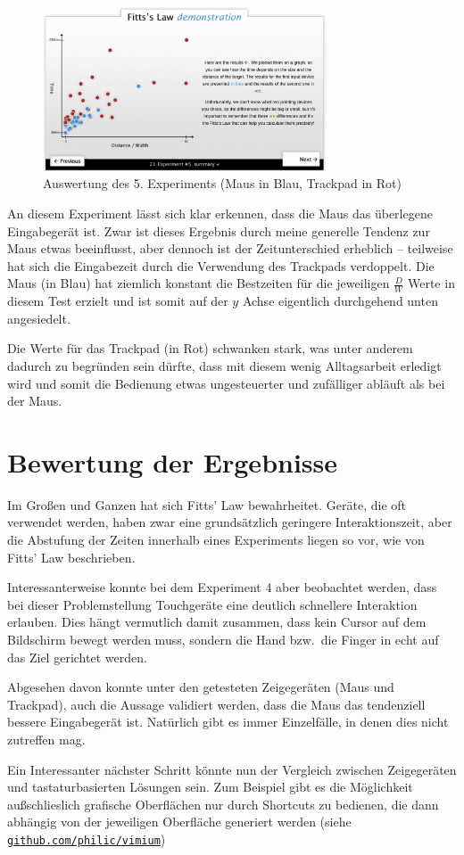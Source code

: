 \documentclass{article}
\begin{document}
\begin{figure}[h!]
	\centering
	\includegraphics[width=0.75\textwidth]{experiment-5-maus-vs-trackpad}
	\caption{Auswertung des 5. Experiments (Maus in Blau, Trackpad in Rot)}
\end{figure}

An diesem Experiment lässt sich klar erkennen, dass die Maus das überlegene
Eingabegerät ist. Zwar ist dieses Ergebnis durch meine generelle Tendenz zur
Maus etwas beeinflusst, aber dennoch ist der Zeitunterschied erheblich –
teilweise hat sich die Eingabezeit durch die Verwendung des Trackpads
verdoppelt. Die Maus (in Blau) hat ziemlich konstant die Bestzeiten für die
jeweiligen $\frac{D}{W}$ Werte in diesem Test erzielt und ist somit auf der $y$
Achse eigentlich durchgehend unten angesiedelt.

Die Werte für das Trackpad (in Rot) schwanken stark, was unter anderem dadurch
zu begründen sein dürfte, dass mit diesem wenig Alltagsarbeit erledigt wird
und somit die Bedienung etwas ungesteuerter und zufälliger abläuft als bei der
Maus.

\section{Bewertung der Ergebnisse}

Im Großen und Ganzen hat sich Fitts' Law bewahrheitet. Geräte, die oft verwendet
werden, haben zwar eine grundsätzlich geringere Interaktionszeit, aber die
Abstufung der Zeiten innerhalb eines Experiments liegen so vor, wie von Fitts'
Law beschrieben.

Interessanterweise konnte bei dem Experiment 4 aber beobachtet werden, dass bei
dieser Problemstellung Touchgeräte eine deutlich schnellere Interaktion erlauben.
Dies hängt vermutlich damit zusammen, dass kein Cursor auf dem Bildschirm bewegt
werden muss, sondern die Hand bzw.\ die Finger in echt auf das Ziel gerichtet
werden.

Abgesehen davon konnte unter den getesteten Zeigegeräten (Maus und Trackpad),
auch die Aussage validiert werden, dass die Maus das tendenziell bessere
Eingabegerät ist. Natürlich gibt es immer Einzelfälle, in denen dies nicht
zutreffen mag.

Ein Interessanter nächster Schritt könnte nun der Vergleich zwischen
Zeigegeräten und tastaturbasierten Lösungen sein. Zum Beispiel gibt es die
Möglichkeit außschlieslich grafische Oberflächen nur durch Shortcuts zu bedienen,
die dann abhängig von der jeweiligen Oberfläche generiert werden (siehe
\href{https://github.com/philc/vimium}{\texttt{github.com/philic/vimium}})
\end{document}

